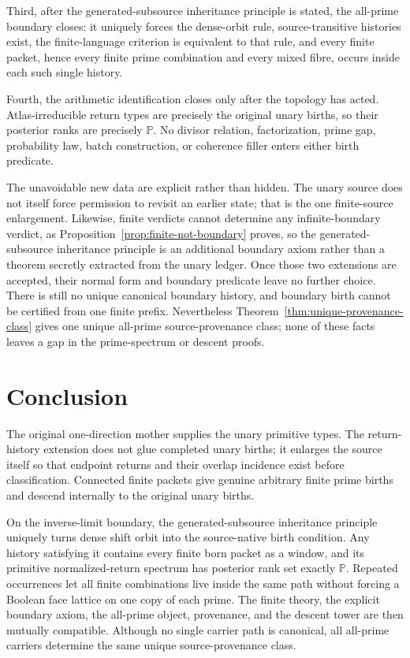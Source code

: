 \documentclass[11pt]{article}
\begin{document}
Third, after the generated-subsource inheritance principle is stated, the
all-prime boundary closes: it uniquely forces the dense-orbit rule,
source-transitive histories exist, the finite-language criterion is
equivalent to that rule, and every finite packet, hence every finite prime
combination and every mixed fibre, occurs inside each such single history.

Fourth, the arithmetic identification closes only after the topology has
acted.  Atlas-irreducible return types are precisely the original unary
births, so their posterior ranks are precisely \(\mathbb P\).  No divisor
relation, factorization, prime gap, probability law, batch construction, or
coherence filler enters either birth predicate.

The unavoidable new data are explicit rather than hidden.  The unary source
does not itself force permission to revisit an earlier state; that is the one
finite-source enlargement.  Likewise, finite verdicts cannot determine any
infinite-boundary verdict, as Proposition~\ref{prop:finite-not-boundary}
proves, so the generated-subsource inheritance principle is an additional
boundary axiom rather than a theorem secretly extracted from the unary
ledger.  Once those two extensions are accepted, their normal form and
boundary predicate leave no further choice.  There is still no unique
canonical boundary history, and boundary birth cannot be certified from one
finite prefix.  Nevertheless
Theorem~\ref{thm:unique-provenance-class} gives one unique all-prime
source-provenance class; none of these facts leaves a gap in the
prime-spectrum or descent proofs.

\section{Conclusion}

The original one-direction mother supplies the unary primitive types.  The
return-history extension does not glue completed unary births; it enlarges
the source itself so that endpoint returns and their overlap incidence exist
before classification.  Connected finite packets give genuine arbitrary
finite prime births and descend internally to the original unary births.

On the inverse-limit boundary, the generated-subsource inheritance principle
uniquely turns dense shift orbit into the source-native birth condition.  Any
history satisfying it contains every finite born packet as a window, and its
primitive normalized-return spectrum has posterior rank set exactly
\(\mathbb P\).  Repeated occurrences let all finite combinations live inside
the same path without forcing a Boolean face lattice on one copy of each
prime.  The finite theory, the explicit boundary axiom, the all-prime object,
provenance, and the descent tower are then mutually compatible.  Although no
single carrier path is canonical, all all-prime carriers determine the same
unique source-provenance class.
\end{document}

